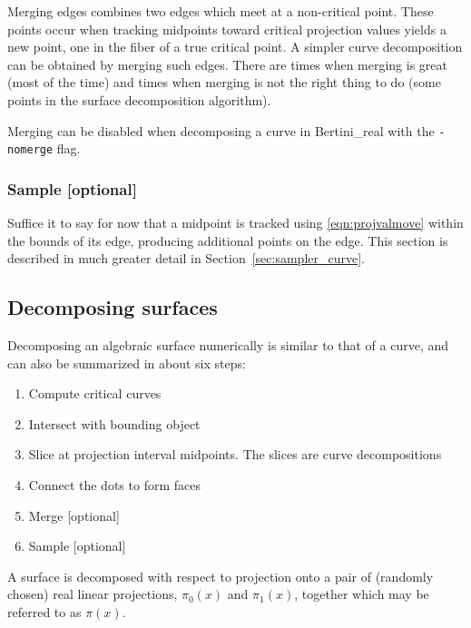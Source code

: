 Merging edges combines two edges which meet at a non-critical point.  These points occur when tracking midpoints toward critical projection values yields a new point, one in the fiber of a true critical point.  A simpler curve decomposition can be obtained by merging such edges.  There are times when merging is great (most of the time) and times when merging is not the right thing to do (some points in the surface decomposition algorithm).

Merging can be disabled when decomposing a curve in Bertini\_real with the {\tt -nomerge} flag.


\subsubsection{Sample [optional]}
Suffice it to say for now that a midpoint is tracked using \eqref{eqn:projvalmove} within the bounds of its edge, producing additional points on the edge.  
This section is described in much greater detail in Section~\ref{sec:sampler_curve}.   



















\subsection{Decomposing surfaces}
\label{sec:algo_surface}


Decomposing an algebraic surface numerically is similar to that of a curve, and can also be summarized in about six steps:
%
\begin{enumerate}
\item Compute critical curves
\item Intersect with bounding object
\item Slice at projection interval midpoints.  The slices are curve decompositions
\item Connect the dots to form faces
\item Merge [optional]
\item Sample [optional]
\end{enumerate}


A surface is decomposed with respect to projection onto a pair of (randomly chosen) real linear projections, $\pi_0(x)$ and $\pi_1(x)$, together which may be referred to as $\pi(x)$.


